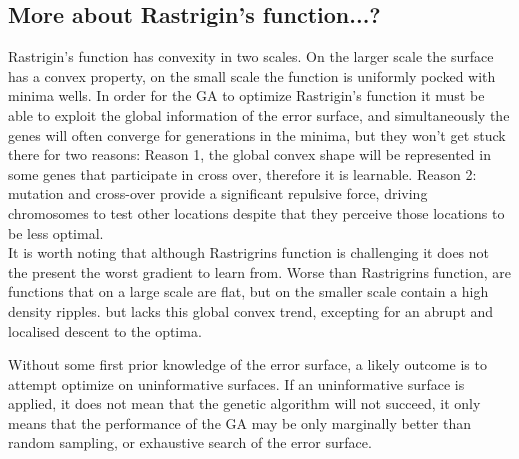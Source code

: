 \subsection{More about Rastrigin's function...?}
Rastrigin's function has convexity in two scales. On the larger scale the surface has a convex property, on the small scale the function is uniformly pocked with minima wells. In order for the GA to optimize Rastrigin's function it must be able to exploit the global information of the error surface, and simultaneously the genes will often converge for generations in the minima, but they won't get stuck there for two reasons: Reason 1, the global convex shape will be represented in some genes that participate in cross over, therefore it is learnable. Reason 2:
 mutation and cross-over provide a significant repulsive force, driving chromosomes to test other locations despite that they perceive those locations to be less optimal.\\
   
   It is worth noting that although Rastrigrins function is challenging it does not the present the worst gradient to learn from. Worse than Rastrigrins function, are functions that on a large scale are flat, but on the smaller scale contain a high density ripples.
   but lacks this global convex trend, excepting for an abrupt and localised descent to the optima.
   
   Without some first prior knowledge of the error surface, a likely outcome is to attempt optimize on uninformative surfaces. If an uninformative surface is applied, it does not mean that the genetic algorithm will not succeed, it only means that the performance of the GA may be only marginally better than random sampling, or exhaustive search of the error surface.


